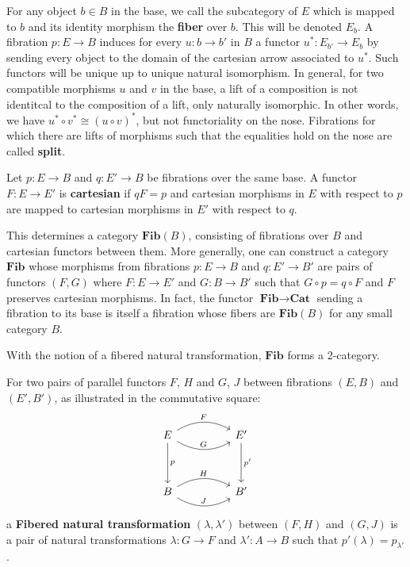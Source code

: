 For any object $b \in B$ in the base, we call the subcategory of $E$ which is mapped to $b$ and its identity morphism the \textbf{fiber} over $b$. This will be denoted $E_b$.
A fibration $p : E \to B$ induces for every $u : b \to b'$ in $B$ a functor $u^*: E_{b'} \to E_{b}$ by sending every object to the domain of the cartesian arrow associated to $u^*$. Such functors will be unique up to unique natural isomorphism. In general, for two compatible morphisms $u$ and $v$ in the base, a lift of a composition is not identitcal to the composition of a lift, only naturally isomorphic. In other words, we have $u^* \circ v^* \cong (u \circ v)^*$, but not functoriality on the nose. Fibrations for which there are lifts of morphisms such that the equalities hold on the nose are called \textbf{split}.

\begin{defn}
Let $p : E \to B$ and $q : E' \to B$ be fibrations over the same base. A functor $F : E \to E'$ is \textbf{cartesian} if $qF = p$ and cartesian morphisms in $E$ with respect to $p$ are mapped to cartesian morphisms in $E'$ with respect to $q$.
\end{defn}
This determines a category $\textbf{Fib}(B)$, consisting of fibrations over $B$ and cartesian functors between them. More generally, one can construct a category $\textbf{Fib}$ whose morphisms from fibrations $p : E \to B$ and $q : E' \to B'$ are pairs of functors $(F, G)$ where $F : E \to E'$ and $G : B \to B'$ such that $G \circ p = q \circ F$ and $F$ preserves cartesian morphisms. In fact, the functor $\textbf{Fib} \to \textbf{Cat}$ sending a fibration to its base is itself a fibration whose fibers are $\textbf{Fib}(B)$ for any small category $B$.


With the notion of a fibered natural transformation, $\mathbf{Fib}$ forms a 2-category.
\begin{defn}
For two pairs of parallel functors $F$, $H$ and $G$, $J$ between fibrations $(E, B)$ and $(E', B')$, as illustrated in the commutative square:
\[
\ti
E \ar[d, "p"] \ar[r, "F", bend left] \ar[r, "G", bend right] & E' \ar[d, "{p'}"]\\
B \ar[r, "H", bend left] \ar[r, "J", bend right] & B'
\kz
\]
a \textbf{Fibered natural transformation} $(\lambda, \lambda')$ between $(F, H)$ and $(G, J)$ is a pair of natural transformations $\lambda : G \to F$ and $\lambda' : A \to B$ such that $p'(\lambda) = p_{\lambda'}$.
\end{defn}

